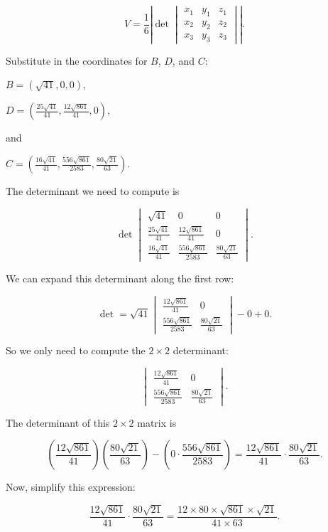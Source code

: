 \[ V = \frac{1}{6} \left| \det \begin{vmatrix}
x_1 & y_1 & z_1 \\ 
x_2 & y_2 & z_2 \\ 
x_3 & y_3 & z_3 
\end{vmatrix} \right|. \]

Substitute in the coordinates for $B$, $D$, and $C$:

$B = \left(\sqrt{41}, 0, 0\right),$

$D = \left(\frac{25 \sqrt{41}}{41}, \frac{12 \sqrt{861}}{41}, 0\right),$

and 

$C = \left(\frac{16 \sqrt{41}}{41}, \frac{556 \sqrt{861}}{2583}, \frac{80 \sqrt{21}}{63}\right).$

The determinant we need to compute is

\[ \det \begin{vmatrix}
\sqrt{41} & 0 & 0 \\ 
\frac{25 \sqrt{41}}{41} & \frac{12 \sqrt{861}}{41} & 0 \\ 
\frac{16 \sqrt{41}}{41} & \frac{556 \sqrt{861}}{2583} & \frac{80 \sqrt{21}}{63}
\end{vmatrix}. \]

We can expand this determinant along the first row:

\[ \det = \sqrt{41} \begin{vmatrix} \frac{12 \sqrt{861}}{41} & 0 \\ \frac{556 \sqrt{861}}{2583} & \frac{80 \sqrt{21}}{63} \end{vmatrix} - 0 + 0. \]

So we only need to compute the $2 \times 2$ determinant:

\[ \begin{vmatrix} \frac{12 \sqrt{861}}{41} & 0 \\ \frac{556 \sqrt{861}}{2583} & \frac{80 \sqrt{21}}{63} \end{vmatrix}. \]

The determinant of this $2 \times 2$ matrix is

\[ \left(\frac{12 \sqrt{861}}{41}\right) \left(\frac{80 \sqrt{21}}{63}\right) - \left(0 \cdot \frac{556 \sqrt{861}}{2583}\right) = \frac{12 \sqrt{861}}{41} \cdot \frac{80 \sqrt{21}}{63}. \]

Now, simplify this expression:

\[ \frac{12 \sqrt{861}}{41} \cdot \frac{80 \sqrt{21}}{63} = \frac{12 \times 80 \times \sqrt{861} \times \sqrt{21}}{41 \times 63}. \]

